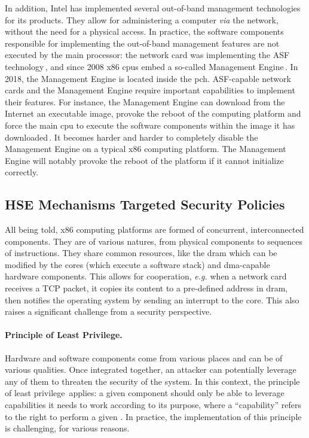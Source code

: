 In addition, Intel has implemented several out-of-band management technologies
for its products.
%
They allow for administering a computer \emph{via} the network, without the
need for a physical access.
%
In practice, the software components responsible for implementing the
out-of-band management features are not executed by the main processor: the network card was implementing the ASF
technology\,\cite{duflot2010network}, and
since 2008 x86 \acp{cpu} embed a so-called Management Engine\,\cite{ruan2014me,skochinsky2014intel}.
%
In 2018, the Management Engine is located inside the \ac{pch}.
%
ASF-capable network cards and the Management Engine require important
capabilities to implement their features.
%
For instance, the Management Engine can download from the Internet an executable
image, provoke the reboot of the computing platform and force the main \ac{cpu}
to execute the software components within the image it has
downloaded\,\cite{kumar2009active}.
%
It becomes harder and harder to completely disable the Management Engine on a
typical x86 computing platform.
%
The Management Engine will notably provoke the reboot of the platform if it
cannot initialize correctly.

\subsection{HSE Mechanisms Targeted Security Policies}
\label{subsec:usecase:targetedsec}

All being told, x86 computing platforms are formed of concurrent, interconnected
components.
%
They are of various natures, from physical components to sequences of
instructions.
%
They share common resources, like the \ac{dram} which can be modified by the
cores (which execute a software stack) and \ac{dma}-capable hardware components.
%
This allows for cooperation, \emph{e.g.} when a network card receives a TCP
packet, it copies its content to a pre-defined address in \ac{dram}, then
notifies the operating system by sending an interrupt to the core.
%
This also raises a significant challenge from a security perspective.

\paragraph{Principle of Least Privilege.}
%
Hardware and software components come from various places and can be of various
qualities.
%
Once integrated together, an attacker can potentially leverage any of them to threaten the security of the system.
%
In this context, the principle of least
privilege\,\cite{saltzer1975leastprivilege} applies: a given component should
only be able to leverage capabilities it needs to work according to its purpose,
where a ``capability'' refers to the right to perform a given \IO.
%
In practice, the implementation of this principle is challenging, for various
reasons.

